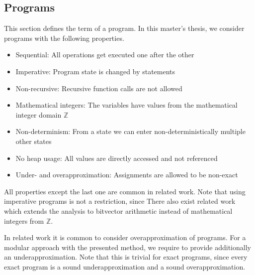 \subsection{Programs}

This section defines the term of a program.
In this master's thesis, we consider programs with the following properties.

\begin{itemize}
\item Sequential: All operations get executed one after the other
\item Imperative: Program state is changed by statements
\item Non-recursive: Recursive function calls are not allowed
\item Mathematical integers: The variables have values from the mathematical integer domain $\mathbb{Z}$
\item Non-determinism: From a state we can enter non-deterministically multiple other states
\item No heap usage: All values are directly accessed and not referenced
\item Under- and overapproximation: Assignments are allowed to be non-exact
\end{itemize}

All properties except the last one are common in related work.
Note that using imperative programs is not a restriction, since 
There also exist related work which extends the analysis to bitvector arithmetic instead of mathematical integers from $\mathbb{Z}$. \cite{bitvectorarithmetic}

In related work it is common to consider overapproximation of programs.
For a modular approach with the presented method, we require to provide additionally an underapproximation.
Note that this is trivial for exact programs, since every exact program is a sound underapproximation and a sound overapproximation.


